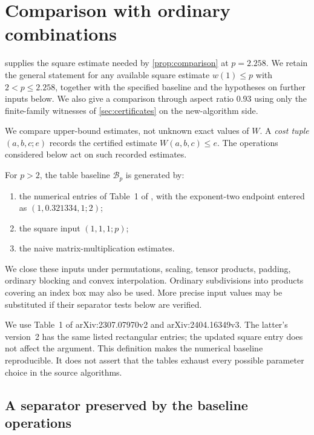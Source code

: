 \section{Comparison with ordinary combinations}\label{sec:comparison}

 supplies the square estimate needed by
\cref{prop:comparison} at \(p=2.258\).
We retain the general statement for any available square estimate
\(w(1)\le p\) with \(2<p\le2.258\), together with the specified
baseline and the hypotheses on further inputs below.
We also give a comparison through aspect ratio \(0.93\) using only
the finite-family witnesses of \cref{sec:certificates} on the
new-algorithm side.

We compare upper-bound estimates, not unknown exact values of \(W\).
A \emph{cost tuple} \((a,b,c;e)\) records the certified estimate
\(W(a,b,c)\le e\).
The operations considered below act on such recorded estimates.

\begin{definition}\label{def:baseline}
For \(p>2\), the table baseline \(\mathcal B_p\) is generated by:
\begin{enumerate}
 \item the numerical entries of Table~1 of \cite{vxxz,advxxz}, with the
 exponent-two endpoint entered as \((1,0.321334,1;2)\);
 \item the square input \((1,1,1;p)\);
 \item the naive matrix-multiplication estimates.
\end{enumerate}
We close these inputs under permutations, scaling, tensor products,
padding, ordinary blocking and convex interpolation.
Ordinary subdivisions into products covering an index box may also
be used.
More precise input values may be substituted if their separator tests
below are verified.
\end{definition}

We use Table~1 of arXiv:2307.07970v2 and arXiv:2404.16349v3.
The latter's version~2 has the same listed rectangular entries;
the updated square entry does not affect the argument.
This definition makes the numerical baseline reproducible.
It does not assert that the tables exhaust every possible parameter
choice in the source algorithms.

\subsection{A separator preserved by the baseline operations}


